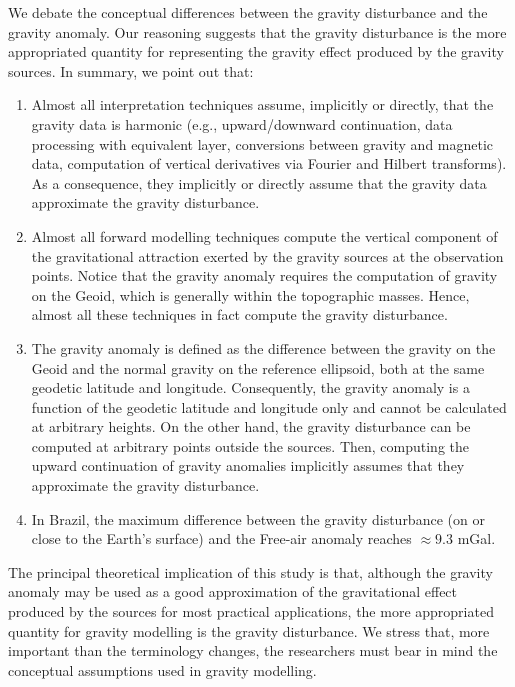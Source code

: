 \documentclass[extra]{gji}
\begin{document}
We debate the conceptual differences between the gravity
disturbance and the gravity anomaly.
Our reasoning suggests that the gravity disturbance is the
more appropriated quantity for representing the gravity
effect produced by the gravity sources.
In summary, we point out that:

\begin{enumerate}
\renewcommand{\theenumii}{\alph{enumii}}

\item Almost all interpretation techniques assume, implicitly or
directly, that the gravity data is harmonic (e.g.,
upward/downward continuation,
data processing with equivalent layer,
conversions between gravity and magnetic data,
computation of vertical derivatives via Fourier and Hilbert
transforms). As a consequence, they implicitly or directly assume that
the gravity data approximate the gravity disturbance.

\item Almost all forward modelling techniques compute
the vertical component of the gravitational attraction
exerted by the gravity sources at the observation points.
Notice that the gravity anomaly requires the computation of gravity
on the Geoid, which is generally within the topographic masses.
Hence, almost all these techniques in fact compute the gravity
disturbance.

\item The gravity anomaly is defined as the difference between
the gravity on the Geoid and the normal gravity on the reference
ellipsoid, both at the same geodetic latitude and longitude.
Consequently, the gravity anomaly is a function of
the geodetic latitude and longitude only and cannot
be calculated at arbitrary heights. On the other hand,
the gravity disturbance can be computed at arbitrary points
outside the sources. Then, computing the upward
continuation of gravity anomalies implicitly assumes
that they approximate the gravity disturbance.

\item In Brazil, the maximum difference between the gravity
disturbance (on or close to the Earth's surface) and the Free-air
anomaly reaches $\approx 9.3$ mGal.

\end{enumerate}

The principal theoretical implication of this study is that,
although the gravity anomaly may be used as a good approximation of
the gravitational effect produced by the sources for most practical applications,
the more appropriated quantity for gravity modelling is the
gravity disturbance. We stress that, more important than the
terminology changes, the researchers must bear in mind the
conceptual assumptions used in gravity modelling.
\end{document}
